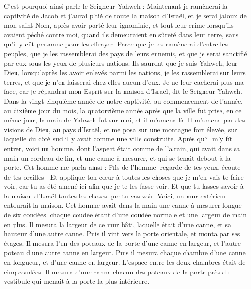 \begin{multicols}{2}
C'est pourquoi ainsi parle le Seigneur Yahweh : Maintenant je ramènerai la captivité de Jacob et j'aurai pitié de toute la maison d'Israël, et je serai jaloux de mon saint Nom,
après avoir porté leur ignominie, et tout leur crime lorsqu'ils avaient péché contre moi, quand ils demeuraient en sûreté dans leur terre, sans qu'il y eût personne pour les effrayer.
Parce que je les ramènerai d'entre les peuples, que je les rassemblerai des pays de leurs ennemis, et que je serai sanctifié par eux sous les yeux de plusieurs nations.
Ils sauront que je suis Yahweh, leur Dieu, lorsqu'après les avoir enlevés parmi les nations, je les rassemblerai sur leurs terres, et que je n'en laisserai chez elles aucun d'eux.
Je ne leur cacherai plus ma face, car je répandrai mon Esprit sur la maison d'Israël, dit le Seigneur Yahweh.
\VerseOne{}Dans la vingt-cinquième année de notre captivité, au commencement de l'année, au dixième jour du mois, la quatorzième année après que la ville fut prise, en ce même jour, la main de Yahweh fut sur moi, et il m'amena là.
Il m'amena par des visions de Dieu, au pays d'Israël, et me posa sur une montagne fort élevée, sur laquelle du côté sud il y avait comme une ville construite.
Après qu'il m'y fît entrer, voici un homme, dont l'aspect était comme de l'airain, qui avait dans sa main un cordeau de lin, et une canne à mesurer, et qui se tenait debout à la porte.
Cet homme me parla ainsi : Fils de l'homme, regarde de tes yeux, écoute de tes oreilles ! Et applique ton cœur à toutes les choses que je m'en vais te faire voir, car tu as été amené ici afin que je te les fasse voir. Et que tu fasses savoir à la maison d'Israël toutes les choses que tu vas voir.
Voici, un mur extérieur entourait la maison. Cet homme avait dans la main une canne à mesurer longue de six coudées, chaque coudée étant d'une coudée normale et une largeur de main en plus. Il mesura la largeur de ce mur bâti, laquelle était d'une canne, et sa hauteur d'une autre canne.
Puis il vint vers la porte orientale, et monta par ses étages. Il mesura l'un des poteaux de la porte d'une canne en largeur, et l'autre poteau d'une autre canne en largeur.
Puis il mesura chaque chambre d'une canne en longueur, et d'une canne en largeur. L'espace entre les deux chambres était de cinq coudées. Il mesura d'une canne chacun des poteaux de la porte près du vestibule qui menait à la porte la plus intérieure.

\end{multicols}
